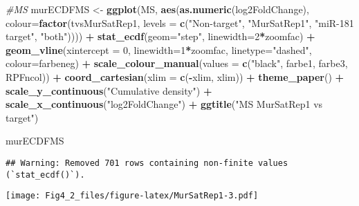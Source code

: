 \documentclass[
]{article}
\newenvironment{Shaded}{\begin{snugshade}}{\end{snugshade}}
\newcommand{\AttributeTok}[1]{\textcolor[rgb]{0.13,0.29,0.53}{#1}}
\newcommand{\CommentTok}[1]{\textcolor[rgb]{0.56,0.35,0.01}{\textit{#1}}}
\newcommand{\DecValTok}[1]{\textcolor[rgb]{0.00,0.00,0.81}{#1}}
\newcommand{\FunctionTok}[1]{\textcolor[rgb]{0.13,0.29,0.53}{\textbf{#1}}}
\newcommand{\NormalTok}[1]{#1}
\newcommand{\OtherTok}[1]{\textcolor[rgb]{0.56,0.35,0.01}{#1}}
\newcommand{\SpecialCharTok}[1]{\textcolor[rgb]{0.81,0.36,0.00}{\textbf{#1}}}
\newcommand{\StringTok}[1]{\textcolor[rgb]{0.31,0.60,0.02}{#1}}
\begin{document}
\begin{Shaded}
\begin{Highlighting}[]
\CommentTok{\#MS}
\NormalTok{murECDFMS }\OtherTok{\textless{}{-}} \FunctionTok{ggplot}\NormalTok{(MS, }\FunctionTok{aes}\NormalTok{(}\FunctionTok{as.numeric}\NormalTok{(log2FoldChange), }\AttributeTok{colour=}\FunctionTok{factor}\NormalTok{(tvsMurSatRep1, }\AttributeTok{levels =} \FunctionTok{c}\NormalTok{(}\StringTok{"Non{-}target"}\NormalTok{, }\StringTok{"MurSatRep1"}\NormalTok{, }\StringTok{"miR{-}181 target"}\NormalTok{, }\StringTok{"both"}\NormalTok{)))) }\SpecialCharTok{+} 
  \FunctionTok{stat\_ecdf}\NormalTok{(}\AttributeTok{geom=}\StringTok{"step"}\NormalTok{, }\AttributeTok{linewidth=}\DecValTok{2}\SpecialCharTok{*}\NormalTok{zoomfac) }\SpecialCharTok{+}
  \FunctionTok{geom\_vline}\NormalTok{(}\AttributeTok{xintercept =} \DecValTok{0}\NormalTok{, }\AttributeTok{linewidth=}\DecValTok{1}\SpecialCharTok{*}\NormalTok{zoomfac, }\AttributeTok{linetype=}\StringTok{"dashed"}\NormalTok{, }\AttributeTok{colour=}\NormalTok{farbeneg) }\SpecialCharTok{+}
  \FunctionTok{scale\_colour\_manual}\NormalTok{(}\AttributeTok{values =} \FunctionTok{c}\NormalTok{(}\StringTok{"black"}\NormalTok{, farbe1, farbe3, RPFncol)) }\SpecialCharTok{+}
  \FunctionTok{coord\_cartesian}\NormalTok{(}\AttributeTok{xlim =} \FunctionTok{c}\NormalTok{(}\SpecialCharTok{{-}}\NormalTok{xlim, xlim)) }\SpecialCharTok{+} 
  \FunctionTok{theme\_paper}\NormalTok{() }\SpecialCharTok{+}
  \FunctionTok{scale\_y\_continuous}\NormalTok{(}\StringTok{"Cumulative density"}\NormalTok{) }\SpecialCharTok{+} \FunctionTok{scale\_x\_continuous}\NormalTok{(}\StringTok{"log2FoldChange"}\NormalTok{) }\SpecialCharTok{+}
  \FunctionTok{ggtitle}\NormalTok{(}\StringTok{"MS MurSatRep1 vs target"}\NormalTok{)}

\NormalTok{murECDFMS}
\end{Highlighting}
\end{Shaded}

\begin{verbatim}
## Warning: Removed 701 rows containing non-finite values (`stat_ecdf()`).
\end{verbatim}

\texttt{[image: Fig4\_2\_files/figure-latex/MurSatRep1-3.pdf]}
\end{document}
